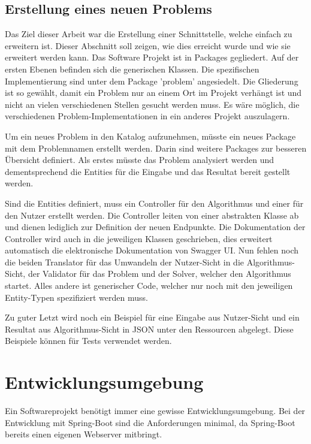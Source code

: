 \FloatBarrier

\subsection{Erstellung eines neuen Problems}
Das Ziel dieser Arbeit war die Erstellung einer Schnittstelle, welche einfach zu erweitern ist. Dieser Abschnitt soll zeigen, wie dies erreicht wurde und wie sie erweitert werden kann. Das 
Software Projekt ist in Packages gegliedert. Auf der ersten Ebenen befinden sich die generischen Klassen. Die spezifischen Implementierung sind unter dem Package 'problem'  angesiedelt. 
Die Gliederung ist so gewählt, damit ein Problem nur an einem Ort im Projekt verhängt ist und nicht an vielen verschiedenen Stellen gesucht werden muss. Es wäre möglich, 
die verschiedenen Problem-Implementationen in ein anderes Projekt auszulagern.

Um ein neues Problem in den Katalog aufzunehmen, 
müsste ein neues Package mit dem Problemnamen erstellt werden. Darin sind weitere Packages zur besseren Übersicht definiert. Als erstes müsste das Problem analysiert werden und 
dementsprechend die Entities für die Eingabe und das Resultat bereit gestellt werden.

Sind die Entities definiert, muss ein Controller für den Algorithmus und einer für den Nutzer erstellt werden. Die Controller leiten von einer abstrakten Klasse ab und dienen lediglich zur Definition
der neuen Endpunkte. Die Dokumentation der Controller wird auch in die jeweiligen Klassen geschrieben, dies erweitert automatisch die elektronische Dokumentation von Swagger UI. 
Nun fehlen noch die beiden Translator für das Umwandeln der Nutzer-Sicht in die Algorithmus-Sicht, der Validator für das Problem und der Solver, welcher den Algorithmus 
startet. Alles andere ist generischer Code, welcher nur noch mit den jeweiligen Entity-Typen spezifiziert werden muss.

Zu guter Letzt wird noch ein Beispiel für eine Eingabe aus Nutzer-Sicht und ein Resultat aus Algorithmus-Sicht in JSON unter den Ressourcen abgelegt. Diese Beispiele können für Tests 
verwendet werden.

\newpage

\section{Entwicklungsumgebung}\label{entwicklungsumgebung}
Ein Softwareprojekt benötigt immer eine gewisse Entwicklungsumgebung. Bei der Entwicklung mit Spring-Boot sind die Anforderungen minimal, da Spring-Boot bereits einen eigenen Webserver 
mitbringt.

